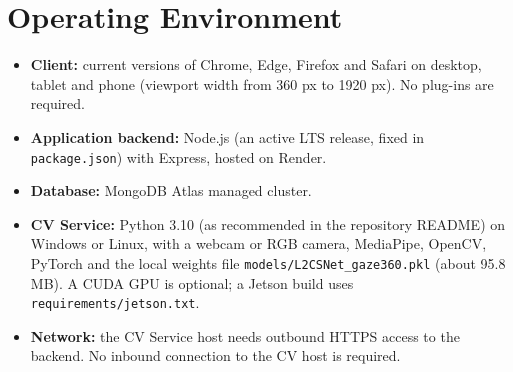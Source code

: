 \documentclass[a4paper,11pt]{scrreprt}
\newcommand{\code}[1]{\texttt{#1}}
\begin{document}
\section{Operating Environment}
\begin{itemize}
  \item \textbf{Client:} current versions of Chrome, Edge, Firefox and Safari on desktop, tablet and phone (viewport width from 360 px to 1920 px). No plug-ins are required.
  \item \textbf{Application backend:} Node.js (an active LTS release, fixed in \code{package.json}) with Express, hosted on Render.
  \item \textbf{Database:} MongoDB Atlas managed cluster.
  \item \textbf{CV Service:} Python 3.10 (as recommended in the repository README) on Windows or Linux, with a webcam or RGB camera, MediaPipe, OpenCV, PyTorch and the local weights file \code{models/L2CSNet_gaze360.pkl} (about 95.8 MB). A CUDA GPU is optional; a Jetson build uses \code{requirements/jetson.txt}.
  \item \textbf{Network:} the CV Service host needs outbound HTTPS access to the backend. No inbound connection to the CV host is required.
\end{itemize}
\end{document}
